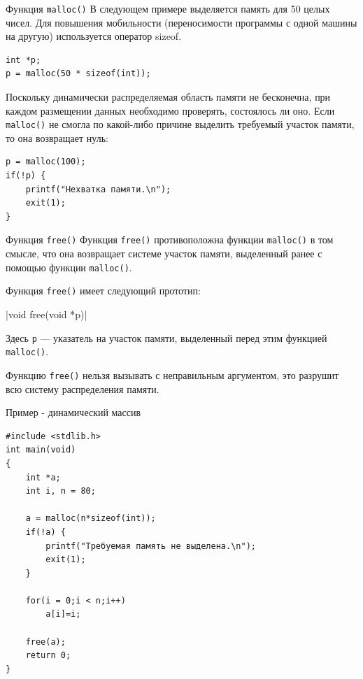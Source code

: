 \documentclass{beamer}
\begin{document}
\begin{frame}[fragile]{Функция \texttt{malloc()}}
    В следующем примере выделяется память для 50 целых чисел. Для повышения мобильности (переносимости программы с одной машины на другую) используется оператор sizeof.

\medskip
\begin{verbatim}
int *p;
p = malloc(50 * sizeof(int));
\end{verbatim}

    \medskip
    Поскольку динамически распределяемая область памяти не бесконечна, при каждом размещении данных необходимо проверять, состоялось ли оно. Если \texttt{malloc()} не смогла по какой-либо причине выделить требуемый участок памяти, то она возвращает нуль:
    
     \medskip
\begin{verbatim}
p = malloc(100);
if(!p) {
    printf("Нехватка памяти.\n");
    exit(1);
}
\end{verbatim}
\end{frame}

\begin{frame}{Функция \texttt{free()}}
    Функция \texttt{free()} противоположна функции \texttt{malloc()} в том смысле, что она возвращает системе участок памяти, выделенный ранее с помощью функции \texttt{malloc()}.
    
    \medskip
    Функция \texttt{free()} имеет следующий прототип:
    
    |void free(void *p)|
    
    \medskip
    Здесь \texttt{p} — указатель на участок памяти, выделенный перед этим функцией \texttt{malloc()}.
    
    \medskip
    Функцию \texttt{free()} нельзя вызывать с неправильным аргументом, это разрушит всю систему распределения памяти.
\end{frame}

\begin{frame}[fragile]{Пример - динамический массив}
\begin{verbatim}
#include <stdlib.h>
int main(void)
{
    int *a;
    int i, n = 80;
    
    a = malloc(n*sizeof(int));
    if(!a) {
        printf("Требуемая память не выделена.\n");
        exit(1);
    }
    
    for(i = 0;i < n;i++)
        a[i]=i;
    
    free(a);
    return 0;
}
\end{verbatim}
\end{frame}
\end{document}
